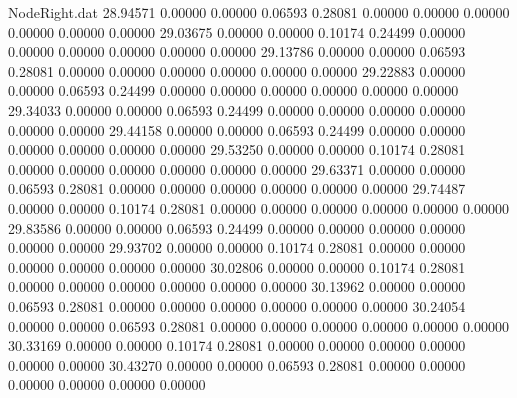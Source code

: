 \begin{filecontents}{NodeRight.dat}
  28.94571    0.00000    0.00000     0.06593    0.28081    0.00000    0.00000    0.00000    0.00000    0.00000    0.00000
  29.03675    0.00000    0.00000     0.10174    0.24499    0.00000    0.00000    0.00000    0.00000    0.00000    0.00000
  29.13786    0.00000    0.00000     0.06593    0.28081    0.00000    0.00000    0.00000    0.00000    0.00000    0.00000
  29.22883    0.00000    0.00000     0.06593    0.24499    0.00000    0.00000    0.00000    0.00000    0.00000    0.00000
  29.34033    0.00000    0.00000     0.06593    0.24499    0.00000    0.00000    0.00000    0.00000    0.00000    0.00000
  29.44158    0.00000    0.00000     0.06593    0.24499    0.00000    0.00000    0.00000    0.00000    0.00000    0.00000
  29.53250    0.00000    0.00000     0.10174    0.28081    0.00000    0.00000    0.00000    0.00000    0.00000    0.00000
  29.63371    0.00000    0.00000     0.06593    0.28081    0.00000    0.00000    0.00000    0.00000    0.00000    0.00000
  29.74487    0.00000    0.00000     0.10174    0.28081    0.00000    0.00000    0.00000    0.00000    0.00000    0.00000
  29.83586    0.00000    0.00000     0.06593    0.24499    0.00000    0.00000    0.00000    0.00000    0.00000    0.00000
  29.93702    0.00000    0.00000     0.10174    0.28081    0.00000    0.00000    0.00000    0.00000    0.00000    0.00000
  30.02806    0.00000    0.00000     0.10174    0.28081    0.00000    0.00000    0.00000    0.00000    0.00000    0.00000
  30.13962    0.00000    0.00000     0.06593    0.28081    0.00000    0.00000    0.00000    0.00000    0.00000    0.00000
  30.24054    0.00000    0.00000     0.06593    0.28081    0.00000    0.00000    0.00000    0.00000    0.00000    0.00000
  30.33169    0.00000    0.00000     0.10174    0.28081    0.00000    0.00000    0.00000    0.00000    0.00000    0.00000
  30.43270    0.00000    0.00000     0.06593    0.28081    0.00000    0.00000    0.00000    0.00000    0.00000    0.00000
\end{filecontents}
